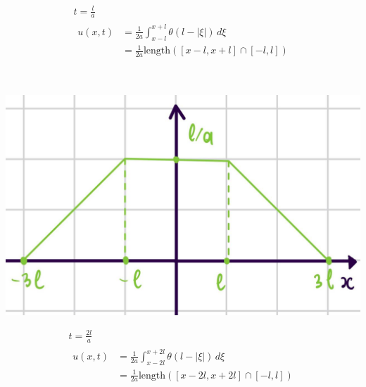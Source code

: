     \begin{minipage}{0.4\textwidth}\raggedleft
      \begin{gather*}
        t = \frac{l}{a} \\
        \begin{split}
        u(x,t) &= \frac{1}{2a} \int_{x- l}^{x + l} \theta(l -|\xi| )\,d\xi \\
               &= \frac{1}{2a} \text{length}\left([x-l,x+l]\cap [-l,l]\right)
        \end{split}
      \end{gather*}
    \end{minipage} \\
    \begin{minipage}{0.4\textwidth}
  \includegraphics[width=1\linewidth]{pictures/u9.jpg} 
    \end{minipage}
    \begin{minipage}{0.4\textwidth}\raggedleft
      \begin{gather*}
        t = \frac{2l}{a} \\
        \begin{split}
        u(x,t) &= \frac{1}{2a} \int_{x- 2l}^{x + 2l} \theta(l -|\xi| )\,d\xi \\
               &= \frac{1}{2a} \text{length}\left([x-2l,x+2l]\cap [-l,l]\right)
        \end{split}
      \end{gather*}
    \end{minipage} \\
